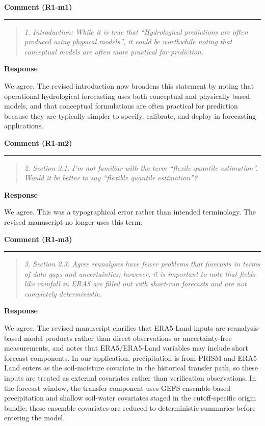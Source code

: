 \documentclass[11pt,letterpaper]{article}
\newcommand{\commentheading}[1]{%
  \vspace{6pt}\noindent\textbf{Comment (#1)}\par
  \vspace{2pt}\hrule\vspace{6pt}
}
\newenvironment{commentblock}{\begin{quote}\small\itshape}{\end{quote}}
\newcommand{\responseheading}{%
  \vspace{2pt}\noindent\textbf{Response}\par
}
\newenvironment{responsebox}{\begin{mdframed}[style=plainbox]}{\end{mdframed}}
\newcommand{\Ronem}[1]{R1-m#1}
\begin{document}
\commentheading{\Ronem{1}}
\begin{commentblock}
1. Introduction: While it is true that “Hydrological predictions are often produced using physical models”, it could be worthwhile noting that conceptual models are often more practical for prediction.
\end{commentblock}
\responseheading
\begin{responsebox}
We agree. The revised introduction now broadens this statement by noting that operational hydrological forecasting uses both conceptual and physically based models, and that conceptual formulations are often practical for prediction because they are typically simpler to specify, calibrate, and deploy in forecasting applications.
\end{responsebox}

\commentheading{\Ronem{2}}
\begin{commentblock}
2. Section 2.1: I’m not familiar with the term “flexile quantile estimation”. Would it be better to say “flexible quantile estimation”?
\end{commentblock}
\responseheading
\begin{responsebox}
We agree. This was a typographical error rather than intended terminology. The revised manuscript no longer uses this term.
\end{responsebox}

\commentheading{\Ronem{3}}
\begin{commentblock}
3. Section 2.3: Agree reanalyses have fewer problems that forecasts in terms of data gaps and uncertainties; however, it is important to note that fields like rainfall in ERA5 are filled out with short-run forecasts and are not completely deterministic.
\end{commentblock}
\responseheading
\begin{responsebox}
We agree. The revised manuscript clarifies that ERA5-Land inputs are reanalysis-based model products rather than direct observations or uncertainty-free measurements, and notes that ERA5/ERA5-Land variables may include short forecast components. In our application, precipitation is from PRISM and ERA5-Land enters as the soil-moisture covariate in the historical transfer path, so these inputs are treated as external covariates rather than verification observations. In the forecast window, the transfer component uses GEFS ensemble-based precipitation and shallow soil-water covariates staged in the cutoff-specific origin bundle; these ensemble covariates are reduced to deterministic summaries before entering the model.
\end{responsebox}
\end{document}
